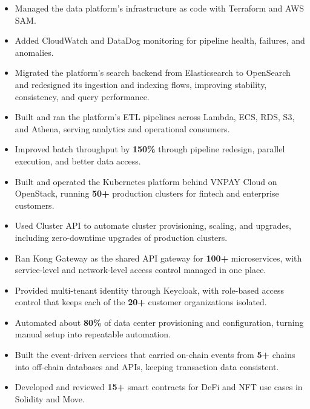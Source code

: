 \begin{itemize}
    \item Managed the data platform's infrastructure as code with Terraform and AWS SAM. %
    \item Added CloudWatch and DataDog monitoring for pipeline health, failures, and anomalies. %
    \item Migrated the platform's search backend from Elasticsearch to OpenSearch and redesigned its ingestion and indexing flows, improving stability, consistency, and query performance. %
    \item Built and ran the platform's ETL pipelines across Lambda, ECS, RDS, S3, and Athena, serving analytics and operational consumers. %
    \item Improved batch throughput by \textbf{150\%} through pipeline redesign, parallel execution, and better data access. %
\end{itemize}

\begin{itemize}
    \item Built and operated the Kubernetes platform behind VNPAY Cloud on OpenStack, running \textbf{50+} production clusters for fintech and enterprise customers. %
    \item Used Cluster API to automate cluster provisioning, scaling, and upgrades, including zero-downtime upgrades of production clusters. %
    \item Ran Kong Gateway as the shared API gateway for \textbf{100+} microservices, with service-level and network-level access control managed in one place. %
    \item Provided multi-tenant identity through Keycloak, with role-based access control that keeps each of the \textbf{20+} customer organizations isolated. %
    \item Automated about \textbf{80\%} of data center provisioning and configuration, turning manual setup into repeatable automation. %
\end{itemize}

\jobEsolLabs
\begin{itemize}
    \item Built the event-driven services that carried on-chain events from \textbf{5+} chains into off-chain databases and APIs, keeping transaction data consistent. %
    \item Developed and reviewed \textbf{15+} smart contracts for DeFi and NFT use cases in Solidity and Move. %
\end{itemize}

